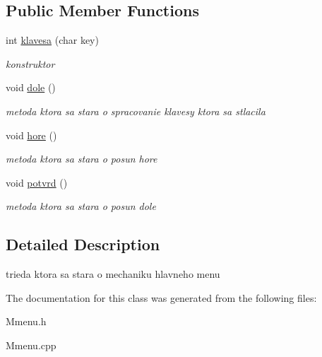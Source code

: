 \subsection*{Public Member Functions}
\begin{DoxyCompactItemize}
\item 
\hypertarget{class_mmenu_adb3a3e05fbd1d06e92ac95fd5333110f}{int \hyperlink{class_mmenu_adb3a3e05fbd1d06e92ac95fd5333110f}{klavesa} (char key)}\label{class_mmenu_adb3a3e05fbd1d06e92ac95fd5333110f}

\begin{DoxyCompactList}\small\item\em konstruktor \end{DoxyCompactList}\item 
\hypertarget{class_mmenu_a9f03620caacd4206c698968f42925418}{void \hyperlink{class_mmenu_a9f03620caacd4206c698968f42925418}{dole} ()}\label{class_mmenu_a9f03620caacd4206c698968f42925418}

\begin{DoxyCompactList}\small\item\em metoda ktora sa stara o spracovanie klavesy ktora sa stlacila \end{DoxyCompactList}\item 
\hypertarget{class_mmenu_a469946d043186402bf546d74abdb7a1e}{void \hyperlink{class_mmenu_a469946d043186402bf546d74abdb7a1e}{hore} ()}\label{class_mmenu_a469946d043186402bf546d74abdb7a1e}

\begin{DoxyCompactList}\small\item\em metoda ktora sa stara o posun hore \end{DoxyCompactList}\item 
\hypertarget{class_mmenu_a2bbeb60a5baa8e9a1070db5695d2991b}{void \hyperlink{class_mmenu_a2bbeb60a5baa8e9a1070db5695d2991b}{potvrd} ()}\label{class_mmenu_a2bbeb60a5baa8e9a1070db5695d2991b}

\begin{DoxyCompactList}\small\item\em metoda ktora sa stara o posun dole \end{DoxyCompactList}\end{DoxyCompactItemize}


\subsection{Detailed Description}
trieda ktora sa stara o mechaniku hlavneho menu 

The documentation for this class was generated from the following files\-:\begin{DoxyCompactItemize}
\item 
Mmenu.\-h\item 
Mmenu.\-cpp\end{DoxyCompactItemize}
